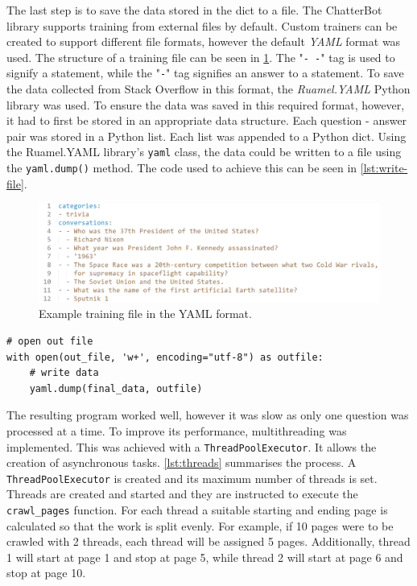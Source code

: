 \documentclass[12pt,a4paper]{article}
\newcommand{\captionstyle}[1] {
    \small{#1}
}
\begin{document}
The last step is to save the data stored in the dict to a file. The ChatterBot library supports training from external files by default. Custom trainers can be created to support different file formats, however the default \textit{YAML} format was used. The structure of a training file can be seen in \cref{fig:yaml-train}. The "\verb|- -|" tag is used to signify a statement, while the "\verb|-|" tag signifies an answer to a statement. To save the data collected from Stack Overflow in this format, the \textit{Ruamel.YAML} Python library was used. To ensure the data was saved in this required format, however, it had to first be stored in an appropriate data structure. Each question - answer pair was stored in a Python list. Each list was appended to a Python dict. Using the Ruamel.YAML library's \texttt{yaml} class, the data could be written to a file using the \texttt{yaml.dump()} method. The code used to achieve this can be seen in \cref{lst:write-file}.

\begin{figure}[!htb]%
    \centering
    \includegraphics[width=1.0\columnwidth]{yaml-train}%
    \caption{\captionstyle{Example training file in the YAML format.}}%
    \label{fig:yaml-train}%
\end{figure}



\begin{lstlisting}[caption={\captionstyle{Writing scraped data to a file in the YAML format.}}, label={lst:write-file}]
# open out file
with open(out_file, 'w+', encoding="utf-8") as outfile:
    # write data
    yaml.dump(final_data, outfile)    
\end{lstlisting}

The resulting program worked well, however it was slow as only one question was processed at a time. To improve its performance, multithreading was implemented. This was achieved with a \texttt{ThreadPoolExecutor}. It allows the creation of asynchronous tasks. \cref{lst:threads} summarises the process. A \texttt{ThreadPoolExecutor} is created and its maximum number of threads is set. Threads are created and started and they are instructed to execute the \texttt{crawl\_pages} function. For each thread a suitable starting and ending page is calculated so that the work is split evenly. For example, if 10 pages were to be crawled with 2 threads, each thread will be assigned 5 pages. Additionally, thread 1 will start at page 1 and stop at page 5, while thread 2 will start at page 6 and stop at page 10.
\end{document}
